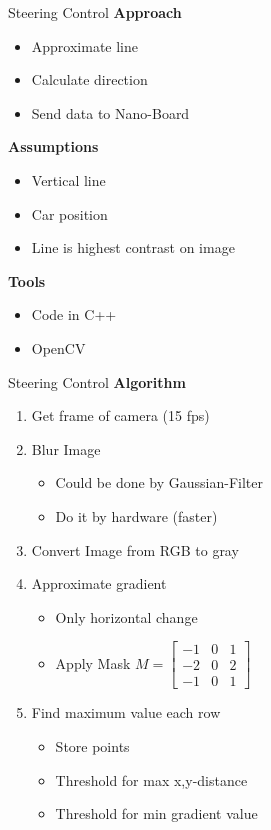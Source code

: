 \begin{frame}[plain]{Steering Control}
	\large 
	\textbf{Approach}
	\begin{itemize}
		\item Approximate line
		\item Calculate direction
		\item Send data to Nano-Board
	\end{itemize}
	\pause
	\textbf{Assumptions}
	\begin{itemize}
		\item Vertical line
		\item Car position
		\item Line is highest contrast on image
	\end{itemize}
	\pause
	\textbf{Tools}
	\begin{itemize}
		\item Code in C++
		\item OpenCV
	\end{itemize}
\end{frame}

\begin{frame}[plain]{Steering Control}
	\large 
	\textbf{Algorithm}	
	\begin{enumerate}
		\item Get frame of camera (15 fps)
		\pause
		\item Blur Image
				\begin{itemize}
					\item Could be done by Gaussian-Filter
					\item Do it by hardware (faster)
				\end{itemize}
		\pause
		\item Convert Image from RGB to gray
		\pause
		\item Approximate gradient
				\begin{itemize}
					\item Only horizontal change
					\item Apply Mask
							$
							M=
							\begin{bmatrix}
							-1 & 0 & 1 \\
							-2 & 0 & 2 \\
							-1 & 0 & 1
							\end{bmatrix}
							$
				\end{itemize}
		\pause
		\item Find maximum value each row
				\begin{itemize}
					\item Store points
					\item Threshold for max x,y-distance
					\item Threshold for min gradient value
				\end{itemize}
	\end{enumerate}
\end{frame}	

